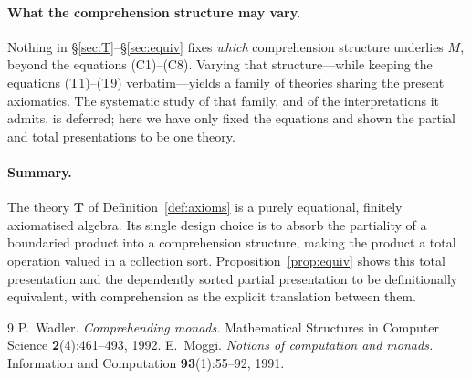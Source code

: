 \documentclass[11pt]{article}
\theoremstyle{definition}
\theoremstyle{plain}
\newcommand{\M}{M}                      %
\begin{document}
\paragraph{What the comprehension structure may vary.}
Nothing in \S\ref{sec:T}--\S\ref{sec:equiv} fixes \emph{which} comprehension
structure underlies $\M$, beyond the equations (C1)--(C8). Varying that
structure---while keeping the equations (T1)--(T9) verbatim---yields a family of
theories sharing the present axiomatics. The systematic study of that family,
and of the interpretations it admits, is deferred; here we have only fixed the
equations and shown the partial and total presentations to be one theory.

\paragraph{Summary.}
The theory $\mathbf{T}$ of Definition~\ref{def:axioms} is a purely equational,
finitely axiomatised algebra. Its single design choice is to absorb the
partiality of a boundaried product into a comprehension structure, making the
product a total operation valued in a collection sort. Proposition~\ref{prop:equiv}
shows this total presentation and the dependently sorted partial presentation
to be definitionally equivalent, with comprehension as the explicit translation
between them.

\begin{thebibliography}{9}
P.~Wadler.
\emph{Comprehending monads.}
Mathematical Structures in Computer Science \textbf{2}(4):461--493, 1992.
E.~Moggi.
\emph{Notions of computation and monads.}
Information and Computation \textbf{93}(1):55--92, 1991.
\end{thebibliography}
\end{document}
